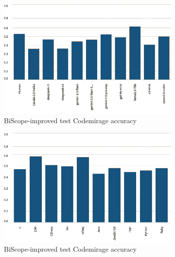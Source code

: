 \begin{figure}[H]
    \centering
    \begin{subfigure}[t]{0.35\textwidth}
        \centering
        \includegraphics[width=\linewidth]{img/TEST/BiScope/visualization(35).png}
        \caption{BiScope-improved test Codemirage accuracy}
        \label{fig:1}
    \end{subfigure}
    \hfill
    \begin{subfigure}[t]{0.35\textwidth}
        \centering
        \includegraphics[width=\linewidth]{img/TEST/BiScope/visualization(34).png}
        \caption{BiScope-improved test Codemirage accuracy}
        \label{fig:b1}
    \end{subfigure}
    \hfill
    \begin{subfigure}[b]{0.5\textwidth}
        \centering

\end{subfigure}
\end{figure}
